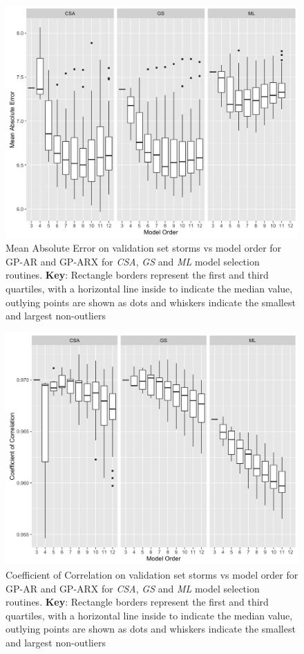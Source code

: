 \documentclass{article}
\begin{document}
\begin{figure}[h]
\includegraphics[width=\textwidth]{Compare-mae-arx.png}
\caption{Mean Absolute Error on validation set storms vs model order for GP-AR and GP-ARX for \emph{CSA}, \emph{GS} and \emph{ML} model selection routines. \textbf{Key}: Rectangle borders represent the first and third quartiles, with a horizontal line inside to indicate the median value, outlying points are shown as dots and whiskers indicate the smallest and largest non-outliers}
\label{fig:CompareMaeARX}
\end{figure}

\begin{figure}[h]
\includegraphics[width=\textwidth]{Compare-cc-arx.png}
\caption{Coefficient of Correlation on validation set storms vs model order for GP-AR and GP-ARX for \emph{CSA}, \emph{GS} and \emph{ML} model selection routines. \textbf{Key}: Rectangle borders represent the first and third quartiles, with a horizontal line inside to indicate the median value, outlying points are shown as dots and whiskers indicate the smallest and largest non-outliers}
\label{fig:CompareCCARX}
\end{figure}
\end{document}
